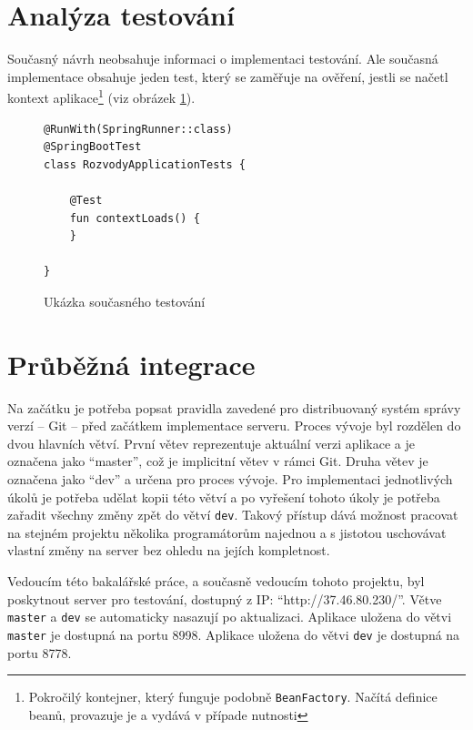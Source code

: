 \section{Analýza testování}\label{analyza:testovani}
    Současný návrh neobsahuje informaci o implementaci testování. Ale současná implementace obsahuje jeden test, který se zaměřuje na ověření, jestli se načetl {kontext aplikace}\footnote{Pokročilý kontejner, který funguje podobně \texttt{BeanFactory}. Načítá definice beanů, provazuje je a vydává v případe nutnosti} (viz obrázek \ref{code:test-context-loads1}).
    \begin{figure}
    \begin{verbatim}
@RunWith(SpringRunner::class)
@SpringBootTest
class RozvodyApplicationTests {

    @Test
    fun contextLoads() {
    }

}
        \end{verbatim}
        \caption{Ukázka současného testování} 
        \label{code:test-context-loads1}
        \end{figure}
        
\section{Průběžná integrace}
    Na začátku je potřeba popsat pravidla zavedené pro distribuovaný systém správy verzí -- Git -- před začátkem implementace serveru. Proces vývoje byl rozdělen do dvou hlavních větví. První větev reprezentuje aktuální verzi aplikace a je označena jako \enquote{master}, což je implicitní větev v rámci Git. Druha větev je označena jako \enquote{dev} a určena pro proces vývoje. Pro implementaci jednotlivých úkolů je potřeba udělat kopii této větví a po vyřešení tohoto úkoly je potřeba zařadit všechny změny zpět do větví \verb|dev|. Takový přístup dává možnost pracovat na stejném projektu několika programátorům najednou a s jistotou uschovávat vlastní změny na server bez ohledu na jejích kompletnost.
    
    Vedoucím této bakalářské práce, a současně vedoucím tohoto projektu, byl poskytnout server pro testování, dostupný z IP: \enquote{http://37.46.80.230/}. Větve \verb|master| a \verb|dev| se automaticky nasazují po aktualizaci. Aplikace uložena do větvi \verb|master| je dostupná na portu 8998. Aplikace uložena do větvi \verb|dev| je dostupná na portu 8778.